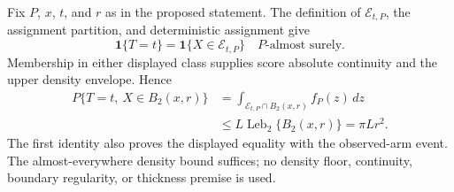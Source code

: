 Fix \(P\), \(x\), \(t\), and \(r\) as in the proposed statement.  The definition of \(\mathcal E_{t,P}\), the assignment partition, and deterministic assignment give
\[
 \mathbf1\{T=t\}=\mathbf1\{X\in\mathcal E_{t,P}\}
 \quad P\text{-almost surely}.
\]
Membership in either displayed class supplies score absolute continuity and the upper density envelope.  Hence
\[
\begin{aligned}
 P\{T=t,\ X\in B_2(x,r)\}
 &=\int_{\mathcal E_{t,P}\cap B_2(x,r)}f_P(z)\,dz\\
 &\leq L\operatorname{Leb}_2\{B_2(x,r)\}
 =\pi Lr^2.
\end{aligned}
\]
The first identity also proves the displayed equality with the observed-arm event.  The almost-everywhere density bound suffices; no density floor, continuity, boundary regularity, or thickness premise is used.